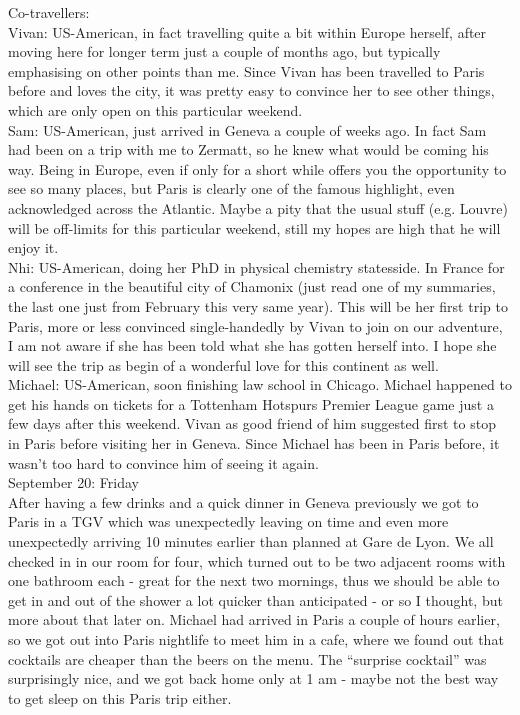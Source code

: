 Co-travellers: \\
Vivan: US-American, in fact travelling quite a bit within Europe herself, after moving here for longer term just a couple of months ago, but typically emphasising on other points than me. Since Vivan has been travelled to Paris before and loves the city, it was pretty easy to convince her to see other things, which are only open on this particular weekend.\\
Sam: US-American, just arrived in Geneva a couple of weeks ago. In fact Sam had been on a trip with me to Zermatt, so he knew what would be coming his way. Being in Europe, even if only for a short while offers you the opportunity to see so many places, but Paris is clearly one of the famous highlight, even acknowledged across the Atlantic. Maybe a pity that the usual stuff (e.g. Louvre) will be off-limits for this particular weekend, still my hopes are high that he will enjoy it.\\
Nhi: US-American, doing her PhD in physical chemistry statesside. In France for a conference in the beautiful city of Chamonix (just read one of my summaries, the last one just from February this very same year). This will be her first trip to Paris, more or less convinced single-handedly by Vivan to join on our adventure, I am not aware if she has been told what she has gotten herself into. I hope she will see the trip as begin of a wonderful love for this continent as well. \\
Michael: US-American, soon finishing law school in Chicago. Michael happened to get his hands on tickets for a Tottenham Hotspurs Premier League game just a few days after this weekend. Vivan as good friend of him suggested first to stop in Paris before visiting her in Geneva. Since Michael has been in Paris before, it wasn't too hard to convince him of seeing it again. \\

September 20: Friday\\
After having a few drinks and a quick dinner in Geneva previously we got to Paris in a TGV which was unexpectedly leaving on time and even more unexpectedly arriving 10 minutes earlier than planned at Gare de Lyon. We all checked in in our room for four, which turned out to be two adjacent rooms with one bathroom each - great for the next two mornings, thus we should be able to get in and out of the shower a lot quicker than anticipated - or so I thought, but more about that later on. Michael had arrived in Paris a couple of hours earlier, so we got out into Paris nightlife to meet him in a cafe, where we found out that cocktails are cheaper than the beers on the menu. The ``surprise cocktail'' was surprisingly nice, and we got back home only at 1 am - maybe not the best way to get sleep on this Paris trip either.\\

